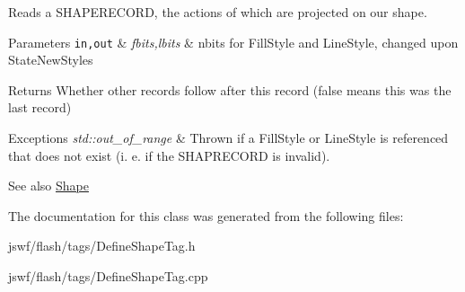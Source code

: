 Reads a {\ttfamily S\+H\+A\+P\+E\+R\+E\+C\+O\+R\+D}, the actions of which are projected on our shape. 


\begin{DoxyParams}[1]{Parameters}
\mbox{\tt in,out}  & {\em fbits,lbits} & nbits for {\ttfamily Fill\+Style} and {\ttfamily Line\+Style}, changed upon {\ttfamily State\+New\+Styles} \\
\hline
\end{DoxyParams}
\begin{DoxyReturn}{Returns}
Whether other records follow after this record ({\ttfamily false} means this was the last record) 
\end{DoxyReturn}

\begin{DoxyExceptions}{Exceptions}
{\em std\+::out\+\_\+of\+\_\+range} & Thrown if a {\ttfamily Fill\+Style} or {\ttfamily Line\+Style} is referenced that does not exist (i. e. if the {\ttfamily S\+H\+A\+P\+R\+E\+C\+O\+R\+D} is invalid). \\
\hline
\end{DoxyExceptions}
\begin{DoxySeeAlso}{See also}
\hyperlink{classjswf_1_1flash_1_1_shape}{Shape} 
\end{DoxySeeAlso}


The documentation for this class was generated from the following files\+:\begin{DoxyCompactItemize}
\item 
jswf/flash/tags/Define\+Shape\+Tag.\+h\item 
jswf/flash/tags/Define\+Shape\+Tag.\+cpp\end{DoxyCompactItemize}
